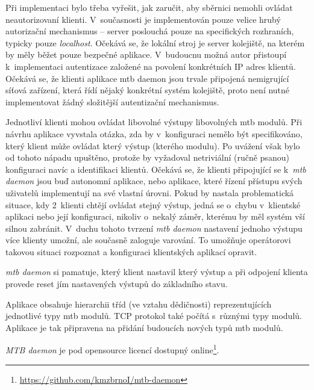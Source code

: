 Při implementaci bylo třeba vyřešit, jak zaručit, aby sběrnici nemohli ovládat
neautorizovaní klienti. V~současnosti je implementován pouze velice hrubý
autorizační mechanismus – server poslouchá pouze na specifických rozhraních,
typicky pouze \textit{localhost}. Očekává se, že lokální stroj je server
kolejiště, na kterém by měly běžet pouze bezpečné aplikace. V~budoucnu možná
autor přistoupí k~implementaci autentizace založené na povolení konkrétních
IP adres klientů. Očekává se, že klienti aplikace \gls{mtb} daemon jsou trvale
připojená nemigrující síťová zařízení, která řídí nějaký konkrétní systém
kolejiště, proto není nutné implementovat žádný složitější autentizační
mechanismus.

Jednotliví klienti mohou ovládat libovolné výstupy libovolných \gls{mtb}
modulů.  Při návrhu aplikace vyvstala otázka, zda by v~konfiguraci nemělo být
specifikováno, který klient může ovládat který výstup (kterého modulu). Po
uvážení však bylo od tohoto nápadu upuštěno, protože by vyžadoval netriviální
(ručně psanou) konfiguraci navíc a identifikaci klientů. Očekává se, že klienti
připojující se k~\textit{\gls{mtb} daemon} jsou buď autonomní aplikace, nebo
aplikace, které řízení přístupu svých uživatelů implementují na své vlastní
úrovni. Pokud by nastala problematická situace, kdy 2~klienti chtějí ovládat
stejný výstup, jedná se o~chybu v~klientské aplikaci nebo její konfiguraci,
nikoliv o~nekalý záměr, kterému by měl systém vší silnou zabránit. V~duchu
tohoto tvrzení \textit{\gls{mtb} daemon} nastavení jednoho výstupu více klienty
umožní, ale současně zaloguje varování. To umožňuje operátorovi takovou
situaci rozpoznat a konfiguraci klientských aplikací opravit.

\textit{\gls{mtb} daemon} si pamatuje, který klient nastavil který výstup a při
odpojení klienta provede reset jím nastavených výstupů do základního stavu.

Aplikace obsahuje hierarchii tříd (ve vztahu dědičnosti) reprezentujících
jednotlivé typy \gls{mtb} modulů. TCP protokol také počítá s~různými typy
modulů. Aplikace je tak připravena na přidání budoucích nových typů \gls{mtb}
modulů.

\textit{MTB daemon} je pod opensource licencí dostupný
online\footnote{\url{https://github.com/kmzbrnoI/mtb-daemon}}.
